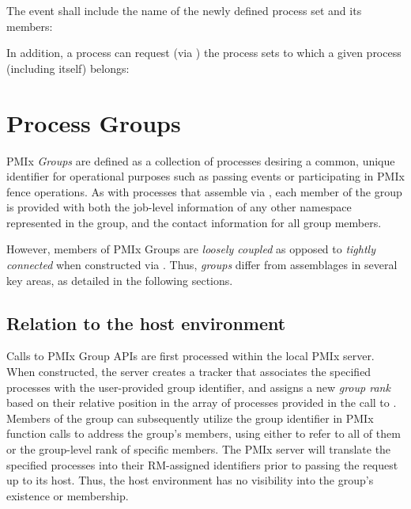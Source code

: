 \vspace{\baselineskip}
The  event shall include the name of the newly defined process set and its members:
%
%

\vspace{\baselineskip}
In addition, a process can request (via ) the process sets to which a given process (including itself) belongs:

%

\section{Process Groups}
\label{chap:api_sets_groups:groups}

\ac{PMIx} \emph{Groups} are defined as a collection of processes desiring a common, unique identifier for operational purposes such as passing events or participating in \ac{PMIx} fence operations. As with processes that assemble via , each member of the group is provided with both the job-level information of any other namespace represented in the group, and the contact information for all group members.

However, members of \ac{PMIx} Groups are \emph{loosely coupled} as opposed to \emph{tightly connected} when constructed via . Thus, \emph{groups} differ from  assemblages in several key areas, as detailed in the following sections.

\subsection{Relation to the host environment}

Calls to \ac{PMIx} Group \acp{API} are first processed within the local \ac{PMIx} server. When constructed, the server creates a tracker that associates the specified processes with the user-provided group identifier, and assigns a new \emph{group rank} based on their relative position in the array of processes provided in the call to . Members of the group can subsequently utilize the group identifier in \ac{PMIx} function calls to address the group’s members, using either  to refer to all of them or the group-level rank of specific members. The \ac{PMIx} server will translate the specified processes into their \ac{RM}-assigned identifiers prior to passing the request up to its host. Thus, the host environment has no visibility into the group’s existence or membership.

